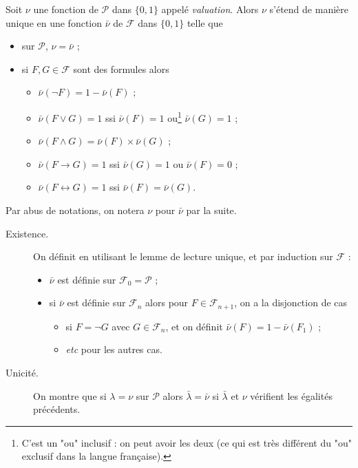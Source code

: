 \documentclass[./main]{subfiles}
\begin{document}
  \begin{lem}
    Soit $\nu$ une fonction de $\mathcal{P}$ dans $\{0,1\}$ appelé \textit{valuation}.
    Alors $\nu$ s'étend de manière unique en une fonction $\bar{\nu}$ de $\mathcal{F}$ dans $\{0,1\}$ telle que 
    \begin{itemize}
      \item sur $\mathcal{P}$, $\nu = \bar{\nu}$ ;
      \item si $F, G \in \mathcal{F}$ sont des formules alors 
        \begin{itemize}
          \item $\bar{\nu}(\lnot F) = 1 - \bar{\nu}(F)$ ;
          \item $\bar{\nu}(F \lor G) = 1$ ssi $\bar{\nu}(F) = 1$ ou\footnote{C'est un "ou" inclusif : on peut avoir les deux (ce qui est très différent du "ou" exclusif dans la langue française).} $\bar{\nu}(G) = 1$ ;
          \item $\bar{\nu}(F \land G) = \bar{\nu}(F) \times \bar{\nu}(G)$ ;
          \item $\bar{\nu}(F \to G) = 1$ ssi $\bar{\nu}(G) = 1$ ou $\bar{\nu}(F) = 0$ ;
          \item $\bar{\nu}(F \leftrightarrow G) = 1$ ssi $\bar{\nu}(F) = \bar{\nu}(G)$.
        \end{itemize}
    \end{itemize}
    Par abus de notations, on notera $\nu$ pour $\bar{\nu}$ par la suite.
  \end{lem}
  \begin{prv}
    \begin{description}
      \item[Existence.]
        On définit en utilisant le lemme de lecture unique, et par induction sur $\mathcal{F}$ :
        \begin{itemize}
          \item $\bar{\nu}$ est définie sur $\mathcal{F}_0 = \mathcal{P}$ ;
          \item si $\bar{\nu}$ est définie sur $\mathcal{F}_n$ alors pour $F \in \mathcal{F}_{n+1}$, on a la disjonction de cas
            \begin{itemize}
              \item si $F = \lnot G$ avec $G \in \mathcal{F}_n$, et on définit $\bar{\nu}(F) = 1 - \bar{\nu}(F_1)$ ;
              \item \textit{etc} pour les autres cas.
            \end{itemize}
        \end{itemize}
      \item[Unicité.]
        On montre que si $\lambda = \nu$ sur $\mathcal{P}$ alors $\bar{\lambda} = \bar{\nu}$ si $\bar{\lambda}$ et $\nu$ vérifient les égalités précédents.
    \end{description}
  \end{prv}
\end{document}
